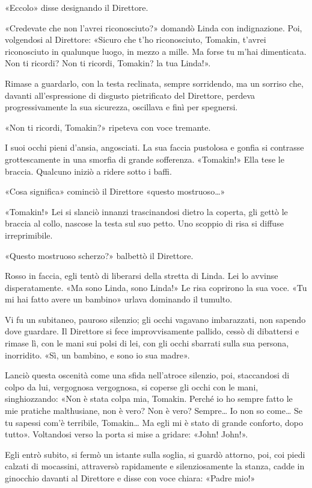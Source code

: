 \documentclass[
a5paper, %
10pt, %
twoside, 
onecolumn, %
openany, %
]{memoir}
\begin{document}
«Eccolo» disse designando il Direttore.

«Credevate che non l’avrei riconosciuto?» domandò Linda con indignazione. Poi, volgendosi al Direttore: «Sicuro che t’ho riconosciuto, Tomakin, t’avrei riconosciuto in qualunque luogo, in mezzo a mille. Ma forse tu m’hai dimenticata. Non ti ricordi? Non ti ricordi, Tomakin? la tua Linda!».

Rimase a guardarlo, con la testa reclinata, sempre sorridendo, ma un sorriso che, davanti all’espressione di disgusto pietrificato del Direttore, perdeva progressivamente la sua sicurezza, oscillava e finì per spegnersi.

«Non ti ricordi, Tomakin?» ripeteva con voce tremante.

I suoi occhi pieni d’ansia, angosciati. La sua faccia pustolosa e gonfia si contrasse grottescamente in una smorfia di grande sofferenza. «Tomakin!» Ella tese le braccia. Qualcuno iniziò a ridere sotto i baffi.

«Cosa significa» cominciò il Direttore «questo mostruoso…»

«Tomakin!» Lei si slanciò innanzi trascinandosi dietro la coperta, gli gettò le braccia al collo, nascose la testa sul suo petto. Uno scoppio di risa si diffuse irreprimibile.

«Questo mostruoso scherzo?» balbettò il Direttore.

Rosso in faccia, egli tentò di liberarsi della stretta di Linda. Lei lo avvinse disperatamente. «Ma sono Linda, sono Linda!» Le risa coprirono la sua voce. «Tu mi hai fatto avere un bambino» urlava dominando il tumulto.

Vi fu un subitaneo, pauroso silenzio; gli occhi vagavano imbarazzati, non sapendo dove guardare. Il Direttore si fece improvvisamente pallido, cessò di dibattersi e rimase lì, con le mani sui polsi di lei, con gli occhi sbarrati sulla sua persona, inorridito. «Sì, un bambino, e sono io sua madre».

Lanciò questa oscenità come una sfida nell’atroce silenzio, poi, staccandosi di colpo da lui, vergognosa vergognosa, si coperse gli occhi con le mani, singhiozzando: «Non è stata colpa mia, Tomakin. Perché io ho sempre fatto le mie pratiche malthusiane, non è vero? Non è vero? Sempre… Io non so come… Se tu sapessi com’è terribile, Tomakin… Ma egli mi è stato di grande conforto, dopo tutto». Voltandosi verso la porta si mise a gridare: «John! John!».

Egli entrò subito, si fermò un istante sulla soglia, si guardò attorno, poi, coi piedi calzati di mocassini, attraversò rapidamente e silenziosamente la stanza, cadde in ginocchio davanti al Direttore e disse con voce chiara: «Padre mio!»
\end{document}
